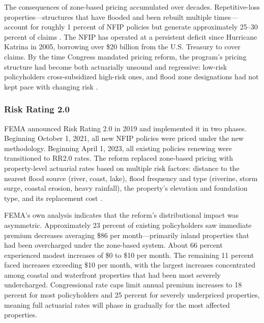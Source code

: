 \documentclass[12pt]{article}
\begin{document}
The consequences of zone-based pricing accumulated over decades. Repetitive-loss properties---structures that have flooded and been rebuilt multiple times---account for roughly 1 percent of NFIP policies but generate approximately 25--30 percent of claims \citep{kousky2018}. The NFIP has operated at a persistent deficit since Hurricane Katrina in 2005, borrowing over \$20 billion from the U.S. Treasury to cover claims. By the time Congress mandated pricing reform, the program's pricing structure had become both actuarially unsound and regressive: low-risk policyholders cross-subsidized high-risk ones, and flood zone designations had not kept pace with changing risk \citep{wing2022}.

\subsubsection*{Risk Rating 2.0} FEMA announced Risk Rating 2.0 in 2019 and implemented it in two phases. Beginning October 1, 2021, all new NFIP policies were priced under the new methodology. Beginning April 1, 2023, all existing policies renewing were transitioned to RR2.0 rates. The reform replaced zone-based pricing with property-level actuarial rates based on multiple risk factors: distance to the nearest flood source (river, coast, lake), flood frequency and type (riverine, storm surge, coastal erosion, heavy rainfall), the property's elevation and foundation type, and its replacement cost \citep{fema2021rr2}.

FEMA's own analysis indicates that the reform's distributional impact was asymmetric. Approximately 23 percent of existing policyholders saw immediate premium decreases averaging \$86 per month---primarily inland properties that had been overcharged under the zone-based system. About 66 percent experienced modest increases of \$0 to \$10 per month. The remaining 11 percent faced increases exceeding \$10 per month, with the largest increases concentrated among coastal and waterfront properties that had been most severely undercharged. Congressional rate caps limit annual premium increases to 18 percent for most policyholders and 25 percent for severely underpriced properties, meaning full actuarial rates will phase in gradually for the most affected properties.
\end{document}
